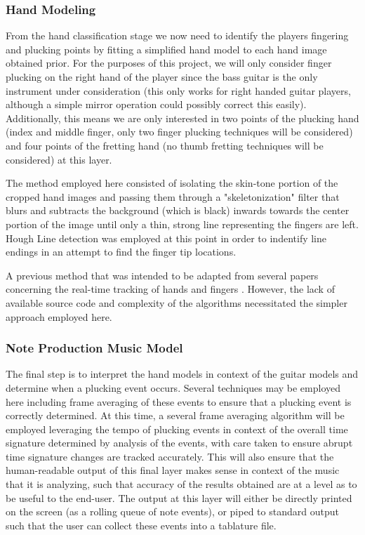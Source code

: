 \subsubsection{Hand Modeling}
From the hand classification stage we now need to identify the players fingering and plucking points
by fitting a simplified hand model to each hand image obtained prior.
For the purposes of this project, we will only consider finger plucking on the right hand of the player
since the bass guitar is the only instrument under consideration
(this only works for right handed guitar players, although a simple mirror operation could possibly correct this easily).
Additionally, this means we are only interested in two points of the plucking hand
(index and middle finger, only two finger plucking techniques will be considered)
and four points of the fretting hand (no thumb fretting techniques will be considered) at this layer.
\par
The method employed here consisted of isolating the skin-tone portion of the cropped hand images \cite{pyimagesearch,seereality}
and passing them through a "skeletonization" filter \cite{skeleton} that blurs and subtracts the background (which is black)
inwards towards the center portion of the image until only a thin, strong line representing the fingers are left.
Hough Line detection was employed at this point in order to indentify line endings in an attempt to find the finger tip locations.
\par
A previous method that was intended to be adapted from several papers concerning the real-time tracking of hands and fingers
\cite{aslhand,handposes,fingertracking}.
However, the lack of available source code and complexity of the algorithms necessitated the simpler approach employed here.

\subsubsection{Note Production Music Model}
The final step is to interpret the hand models in context of the guitar models and determine when a plucking event occurs.
Several techniques may be employed here including frame averaging of these events to ensure that a plucking event
is correctly determined.
At this time, a several frame averaging algorithm will be employed leveraging the tempo of plucking events in context of 
the overall time signature determined by analysis of the events, with care taken to ensure abrupt time signature changes
are tracked accurately.
This will also ensure that the human-readable output of this final layer makes sense in context of the music that it is
analyzing, such that accuracy of the results obtained are at a level as to be useful to the end-user.
The output at this layer will either be directly printed on the screen (as a rolling queue of note events),
or piped to standard output such that the user can collect these events into a tablature file.

